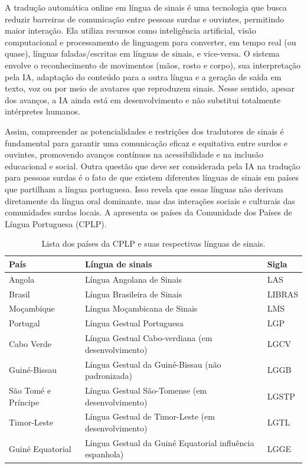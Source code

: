\documentclass[portuguese]{textolivre}
\begin{document}
A tradução automática online em língua de sinais é uma tecnologia que busca reduzir barreiras de comunicação entre pessoas surdas e ouvintes, permitindo maior interação. Ela utiliza recursos como inteligência artificial, visão computacional e processamento de linguagem para converter, em tempo real (ou quase), línguas faladas/escritas em línguas de sinais, e vice-versa. O sistema envolve o reconhecimento de movimentos (mãos, rosto e corpo), sua interpretação pela IA, adaptação do conteúdo para a outra língua e a geração de saída em texto, voz ou por meio de avatares que reproduzem sinais. Nesse sentido, apesar dos avanços, a IA ainda está em desenvolvimento e não substitui totalmente intérpretes humanos.

Assim, compreender as potencialidades e restrições dos tradutores de sinais é fundamental para garantir uma comunicação eficaz e equitativa entre surdos e ouvintes, promovendo avanços contínuos na acessibilidade e na inclusão educacional e social. Outra questão que deve ser considerada pela IA na tradução para pessoas surdas é o fato de que existem diferentes línguas de sinais em países que partilham a língua portuguesa. Isso revela que essas línguas não derivam diretamente da língua oral dominante, mas das interações sociais e culturais das comunidades surdas locais. A  apresenta os países da Comunidade dos Países de Língua Portuguesa (CPLP).

\begin{table}[htbp]
    \centering
    \caption{Lista dos países da CPLP e suas respectivas línguas de sinais.}
    \label{tab2}
    \begin{tabular}{lll}
\toprule
País & Língua de sinais & Sigla \\ \midrule
Angola & Língua Angolana de Sinais & LAS \\
Brasil & Língua Brasileira de Sinais & LIBRAS \\ Moçambique & Língua Moçambicana de Sinais & LMS \\
Portugal & Língua Gestual Portuguesa & LGP \\
Cabo Verde & Língua Gestual Cabo-verdiana (em desenvolvimento) & LGCV \\
Guiné-Bissau & Língua Gestual da Guiné-Bissau (não padronizada) & LGGB \\
São Tomé e Príncipe & Língua Gestual São-Tomense (em desenvolvimento) & LGSTP \\
Timor-Leste & Língua Gestual de Timor-Leste (em desenvolvimento) & LGTL \\
Guiné Equatorial & Língua Gestual da Guiné Equatorial influência espanhola) & LGGE \\ 
\bottomrule
\end{tabular}
\end{table}
\end{document}
